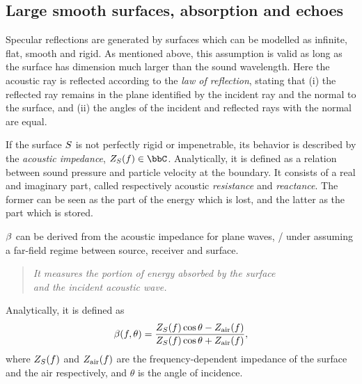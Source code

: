 \subsection{Large smooth surfaces, absorption and echoes}
Specular reflections are generated by surfaces which can be modelled as infinite, flat, smooth and rigid.
As mentioned above, this assumption is valid as long as the surface has dimension much larger than the sound wavelength.
Here the acoustic ray is reflected according to the \textit{law of reflection}, stating that
(i) the reflected ray remains in the plane identified by the incident ray and the normal to the surface,
and (ii) the angles of the incident and reflected rays with the normal are equal.

If the surface $S$ is not perfectly rigid or impenetrable, its behavior is described by the \textit{acoustic impedance}, $\impedence_\surface(f) \in \bbC$.
Analytically, it is defined as a relation between sound pressure and particle velocity at the boundary.
It consists of a real and imaginary part, called respectively acoustic \textit{resistance} and \textit{reactance}.
The former can be seen as the part of the energy which is lost, and the latter as the part which is stored.

 $\beta$ can be derived from the acoustic impedance
for plane waves, \ie/ under assuming a far-field regime between source, receiver and surface.
\begin{quote}
    \textit{It measures the portion of energy absorbed by the surface
    \\and the incident acoustic wave.}
\end{quote}
Analytically, it is defined as  
\begin{equation}
    \beta(f, \theta) = \frac{Z_{S}(f)\cos{\theta} - Z_\text{air}(f)}{Z_{S}(f)\cos{\theta} + Z_\text{air}(f)}
    ,
\end{equation}
where $Z_{S}(f)$ and $Z_\text{air}(f)$ are the frequency-dependent impedance of the surface and the air respectively,
and $\theta$ is the angle of incidence.

